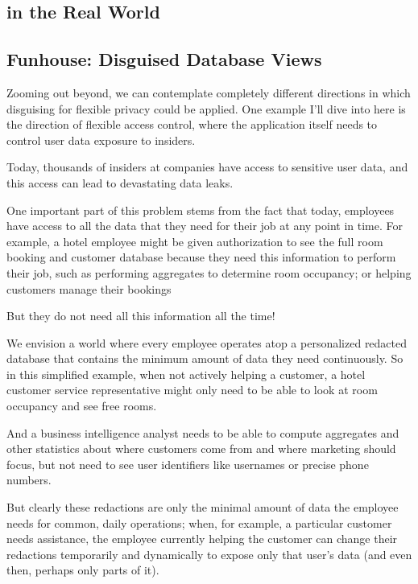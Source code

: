 \subsection{\sys in the Real World}

\subsection{Funhouse: Disguised Database Views}
Zooming out beyond, we can contemplate completely different directions in which
disguising for flexible privacy could be applied. One example I’ll dive into
here is the direction of flexible access control, where the application itself
needs to control user data exposure to insiders.

Today, thousands of insiders at companies have access to sensitive user data,
and this access can lead to devastating data leaks.

One important part of this problem stems from the fact that today, employees
have access to all the data that they need for their job at any point in time.
For example, a hotel employee might be given authorization to see the full room
booking and customer database because they need this information to perform
their job, such as performing aggregates to determine room occupancy; or helping
customers manage their bookings

But they do not need all this information all the time!


We envision a world where every employee operates atop a personalized redacted
database that contains the minimum amount of data they need continuously. So in
this simplified example, when not actively helping a customer, a hotel customer
service representative might only need to be able to look at room occupancy and
see free rooms.

And a business intelligence analyst needs to be able to compute aggregates and
other statistics about where customers come from and where marketing should
focus, but not need to see user identifiers like usernames or precise phone
numbers.


But clearly these redactions are only the minimal amount of data the employee
needs for common, daily operations; when, for example, a particular customer
needs assistance, the employee currently helping the customer can change their
redactions temporarily and dynamically to expose only that user’s data (and even
then, perhaps only parts of it).

